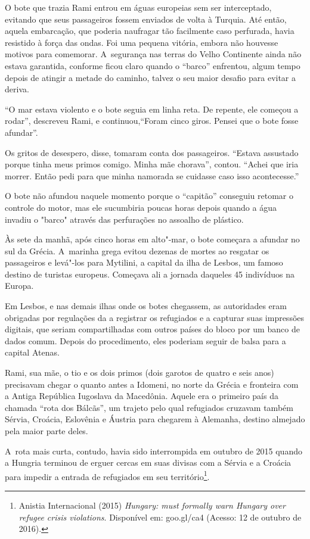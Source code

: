 O bote que trazia Rami entrou em águas europeias sem ser interceptado,
evitando que seus passageiros fossem enviados de volta à Turquia. Até
então, aquela embarcação, que poderia naufragar tão facilmente caso
perfurada, havia resistido à força das ondas. Foi uma pequena
vitória, embora não houvesse motivos para comemorar. A~segurança nas
terras do Velho Continente ainda não estava garantida, conforme ficou
claro quando o ``barco'' enfrentou, algum tempo depois de atingir a
metade do caminho, talvez o seu maior desafio para evitar a deriva.

``O mar estava violento e o bote seguia em linha reta. De repente, ele
começou a rodar'', descreveu Rami, e continuou,``Foram cinco giros. Pensei que o
bote fosse afundar''.

Os gritos de desespero, disse, tomaram conta dos passageiros. ``Estava assustado
porque tinha meus primos comigo. Minha mãe chorava'', contou.
``Achei que iria morrer. Então pedi para que minha namorada se cuidasse
caso isso acontecesse.''

O bote não afundou naquele momento porque o ``capitão'' conseguiu
retomar o controle do motor, mas ele sucumbiria poucas horas depois
quando a água invadiu o "barco" através das perfurações no assoalho de plástico.

Às sete da manhã, após cinco horas em alto"-mar, o bote começara a
afundar no sul da Grécia. A~marinha grega evitou dezenas de mortes ao
resgatar os passageiros e levá"-los para Mytilini, a capital da ilha de
Lesbos, um famoso destino de turistas europeus. Começava ali a jornada
daqueles 45 indivíduos na Europa.

Em Lesbos, e nas demais ilhas onde os botes chegassem, as autoridades
eram obrigadas por regulações da  a registrar os refugiados e a
capturar suas impressões digitais, que seriam compartilhadas com outros
países do bloco por um banco de dados comum. Depois do procedimento,
eles poderiam seguir de balsa para a capital Atenas.

Rami, sua mãe, o tio e os dois primos (dois garotos de quatro e seis
anos) precisavam chegar o quanto antes a Idomeni, no norte da Grécia e fronteira com a Antiga República Iugoslava da Macedônia. Aquele era o primeiro país da chamada ``rota dos Bálcãs'', um trajeto pelo qual refugiados cruzavam também Sérvia, Croácia, Eslovênia e Áustria para chegarem à Alemanha, destino almejado pela maior parte deles.

A~rota mais curta, contudo, havia sido interrompida em outubro de 2015 quando a
Hungria terminou de erguer cercas em suas divisas com a Sérvia e a
Croácia para impedir a entrada de refugiados em seu
território\footnote{ Anistia Internacional (2015) \emph{Hungary:  must
formally warn Hungary over refugee crisis violations}. Disponível em:
goo.gl/ca4
(Acesso: 12 de outubro de 2016).}.


